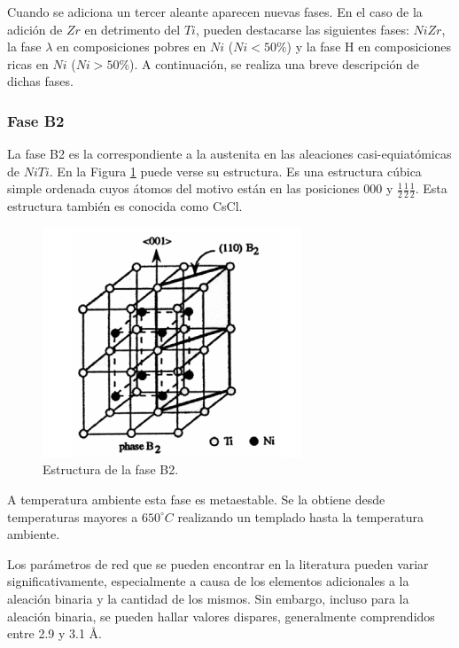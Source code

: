 \documentclass[12pt]{article}
\theoremstyle{definition}
\theoremstyle{remark}
\begin{document}
Cuando se adiciona un tercer aleante aparecen nuevas fases. En el caso de la adición de $Zr$ en detrimento del $Ti$, pueden destacarse las siguientes fases: $NiZr$, la fase $\lambda$ en composiciones pobres en $Ni$ ($Ni < 50\%$) y la fase H en composiciones ricas en $Ni$ ($Ni > 50\%$). A continuación, se realiza una breve descripción de dichas fases.

\subsubsection{Fase B2}
La fase B2 es la correspondiente a la austenita en las aleaciones casi-equiatómicas de $NiTi$. En la Figura \ref{B2phase} puede verse su estructura. Es una estructura cúbica simple ordenada cuyos átomos del motivo están en las posiciones 000 y $\frac{1}{2}\frac{1}{2}\frac{1}{2}$. Esta estructura también es conocida como CsCl.
\begin{figure}[H]
	\centering
	\includegraphics[scale=0.5]{img/B2Phase.png}
	\caption{Estructura de la fase B2.}
	\label{B2phase}
\end{figure}

A temperatura ambiente esta fase es metaestable. Se la obtiene desde temperaturas mayores a $650 ^\circ C$ realizando un templado hasta la temperatura ambiente.

Los parámetros de red que se pueden encontrar en la literatura pueden variar significativamente, especialmente a causa de los elementos adicionales a la aleación binaria y la cantidad de los mismos. Sin embargo, incluso para la aleación binaria, se pueden hallar valores dispares, generalmente comprendidos entre 2.9 y 3.1 \AA \citep{Santamarta}.
\end{document}
